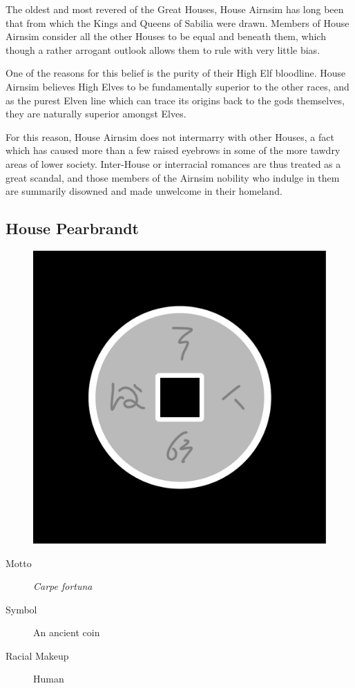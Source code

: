 \documentclass[10pt,twoside,openright,a4paper,twocolumn]{book}
\begin{document}
\noindent
The oldest and most revered of the Great Houses, House Airnsim has long been
that from which the Kings and Queens of Sabilia were drawn.  Members of House
Airnsim consider all the other Houses to be equal and beneath them, which
though a rather arrogant outlook allows them to rule with very little bias.

One of the reasons for this belief is the purity of their High Elf bloodline.
House Airnsim believes High Elves to be fundamentally superior to the other
races, and as the purest Elven line which can trace its origins back to the
gods themselves, they are naturally superior amongst Elves.

For this reason, House Airnsim does not intermarry with other Houses, a fact
which has caused more than a few raised eyebrows in some of the more tawdry
areas of lower society.  Inter-House or interracial romances are thus treated
as a great scandal, and those members of the Airnsim nobility who indulge in
them are summarily disowned and made unwelcome in their homeland.

\subsection*{House Pearbrandt}

\begin{figure}
  \includegraphics[width=0.48\columnwidth]{images/HousePearbrandt}
\end{figure}

\begin{description}
\item[Motto] \textit{Carpe fortuna}

\item[Symbol] An ancient coin

\item[Racial Makeup] Human
\end{description}
\end{document}

